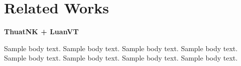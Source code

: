 \section{Related Works}\label{sec2}

\textbf{ThuatNK + LuanVT}

Sample body text. Sample body text. Sample body text. Sample body text. Sample body text. Sample body text. Sample body text. Sample body text.
